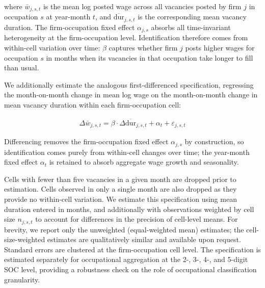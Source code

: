 where $\bar{w}_{j,s,t}$ is the mean log posted wage across all vacancies 
posted by firm $j$ in occupation $s$ at year-month $t$, and 
$\overline{\text{dur}}_{j,s,t}$ is the corresponding mean vacancy duration. 
The firm-occupation fixed effect $\alpha_{j,s}$ absorbs all time-invariant
heterogeneity at the firm-occupation level. Identification therefore comes from within-cell variation over time: $\beta$ captures whether firm $j$ posts higher wages for occupation $s$ in months when its vacancies in that occupation take
longer to fill than usual.

We additionally estimate the analogous first-differenced specification, regressing the month-on-month change in mean log wage on the month-on-month change in mean vacancy duration within each firm-occupation cell:

\begin{align}
\Delta \bar{w}_{j,s,t} = \beta \cdot \Delta \overline{\text{dur}}_{j,s,t} + \alpha_t + \varepsilon_{j,s,t}
\end{align}

Differencing removes the firm-occupation fixed effect $\alpha_{j,s}$ by construction, so identification comes purely from within-cell changes over time; the year-month fixed effect $\alpha_t$ is retained to absorb aggregate wage growth and seasonality.

Cells with fewer than five vacancies in a given month are dropped prior to
estimation. Cells observed in only a single month are also dropped as they 
provide no within-cell variation. We estimate this specification
using mean duration entered in months, and additionally
with observations weighted by cell size $n_{j,s,t}$ to account for
differences in the precision of cell-level means. For brevity, we report only the unweighted (equal-weighted mean) estimates; the cell-size-weighted estimates are qualitatively similar and available upon request. Standard errors are
clustered at the firm-occupation cell level. The specification is estimated 
separately for occupational aggregation at the 2-, 3-, 4-, and 5-digit SOC 
level, providing a robustness check on the role of occupational 
classification granularity.

% 

